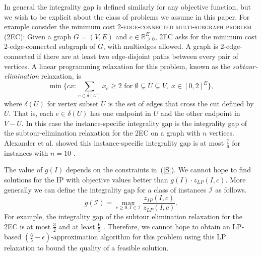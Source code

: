 In general the integrality gap is defined similarly for any objective function, but we wish to be explicit about the class of problems we assume in this paper. For example consider the minimum cost \textsc{2-edge-connected multi-subgraph problem (2EC)}: Given a graph $G=(V,E)$ and $c\in \mathbb{R}^E_{\geq 0}$, 2EC asks for the minimum cost 2-edge-connected subgraph of $G$, with multiedges allowed. A graph is 2-edge-connected if there are at least two edge-disjoint paths between every pair of vertices.  A linear programming relaxation for this problem, known as the {\em subtour-elimination} relaxation, is
 \begin{equation}\min \{cx: \sum_{e\in \delta(U)}x_e \geq 2 \mbox{ for } \emptyset \subsetneq U \subsetneq V,\; x\in [0,2]^{E}\}, 
 \label{eq:subtour}
 \end{equation}
where $\delta(U)$ for vertex subset $U$ is the set of edges that cross the cut defined by $U$.  That is, each $e \in \delta(U)$ has one endpoint in $U$ and the other endpoint in $V-U$.
 In this case the instance-specific integrality gap is the integrality gap of the subtour-elimination relaxation for the 2EC on a graph with $n$ vertices. Alexander et al. \cite{alexander2006integrality} showed this instance-specific integrality gap
is at most $\frac{7}{6}$ for instances with $n= 10$ .

The value of $g(I)$ depends on the constraints in~(\ref{S}).  We cannot hope to find solutions for the IP with objective values better than $g(I)\cdot z_{LP}(I,c)$. More generally we can define the integrality gap for a class of instances $\mathcal{I}$ as follows.%
\begin{equation}\label{gapproblem}
g(\mathcal{I}) = \max_{c\geq 0 , I\in\mathcal{I}}\frac{z_{IP}(I,c)}{z_{LP}(I,c)}.
\end{equation}
For example, the integrality gap of the subtour elimination relaxation for the 2EC is at most $\frac{3}{2}$ \cite{wolsey} and at least $\frac{6}{5}$ \cite{alexander2006integrality}. Therefore, we cannot hope to obtain an LP-based $(\frac{6}{5}-\epsilon)$-approximation algorithm for this problem using this LP relaxation to bound the quality of a feasible solution.

